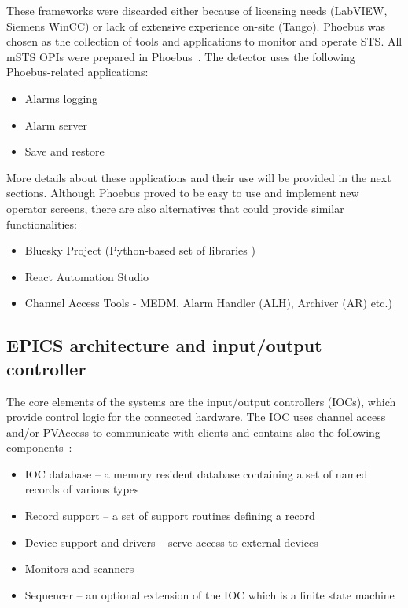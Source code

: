  These frameworks were discarded either because of licensing needs (LabVIEW, Siemens WinCC) or lack of extensive experience on-site (Tango). Phoebus \cite{Phoebus} was chosen as the collection of tools and applications to monitor and operate \gls{STS}. All \gls{mSTS} \glspl{OPI} were prepared in Phoebus~\cite{Phoebus}. The detector uses the following Phoebus-related applications:
\begin{itemize}
    \item Alarms logging
    \item Alarm server
    \item Save and restore
\end{itemize}
More details about these applications and their use will be provided in the next sections. Although Phoebus proved to be easy to use and implement new operator screens, there are also alternatives that could provide similar functionalities:
\begin{itemize}
    \item Bluesky Project (Python-based set of libraries \cite{Bluesky})
    \item React Automation Studio \cite{React}
    \item Channel Access Tools - MEDM, Alarm Handler (\gls{ALH}), Archiver (\gls{AR}) etc.) 
\end{itemize}

\subsection{EPICS architecture and input/output controller}
The core elements of the systems are the input/output controllers (\glspl{IOC}), which provide control logic for the connected hardware. The \gls{IOC} uses channel access and/or PVAccess to communicate with clients and contains also the following components~\cite{IOC}:
\begin{itemize}
    \item \gls{IOC} database -- a memory resident database containing a set of named records of various types \cite{IOC2}
    \item Record support -- a set of support routines defining a record
    \item Device support and drivers -- serve access to external devices
    \item Monitors and scanners
    \item Sequencer -- an optional extension of the \gls{IOC} which is a finite state machine
\end{itemize}

